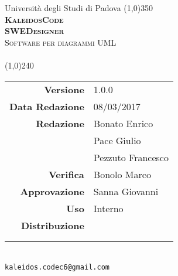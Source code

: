 \documentclass[a4paper,12pt]{article}
\author{KaleidosCode}
\date{08/03/2017}	%
\begin{document}
	\begin{titlepage}
		\centering Università degli Studi di Padova
		\line(1,0){350}\\
		\vspace{0.4cm}
		{\bfseries\scshape\LARGE KaleidosCode\\}
		\vspace{0.4cm}
		{\bfseries\scshape\LARGE SWEDesigner\\}
		{\scshape\Large Software per diagrammi UML\\}
		\vspace{1cm}
		{\scshape\Large \studiodifattibilitai\ \\}		%
		\vspace{1.4cm}
		\logo
		\vspace{1.2cm}
		\line(1,0){240}\\
		\begin{tabular}{r|l}
			{\hfill \textbf{Versione}} 			& 1.0.0\\
			{\hfill \textbf{Data Redazione}} 	& 08/03/2017\\	%
			{\hfill \textbf{Redazione}} 		& Bonato Enrico\\ & Pace Giulio\\ & Pezzuto Francesco\\
			{\hfill \textbf{Verifica}} 			& Bonolo Marco\\
			{\hfill \textbf{Approvazione}} 		& Sanna Giovanni\\
			{\hfill \textbf{Uso}} 				& Interno\\
			{\hfill \textbf{Distribuzione}} 	& \vardanega \\ & \cardin \\ & \proponente\\
		\end{tabular}\\
		\vspace{2cm}
		\texttt{kaleidos.codec6@gmail.com}
	\end{titlepage}

	\pagestyle{myfront}
	\newpage
		
	\newpage
		\tableofcontents
	\pagestyle{mymain}
	\newpage
		
	\newpage
		
	\newpage
		
	\newpage
		
	\newpage
		
	\newpage
		
	\newpage
		

	\label{LastPage}
\end{document}
